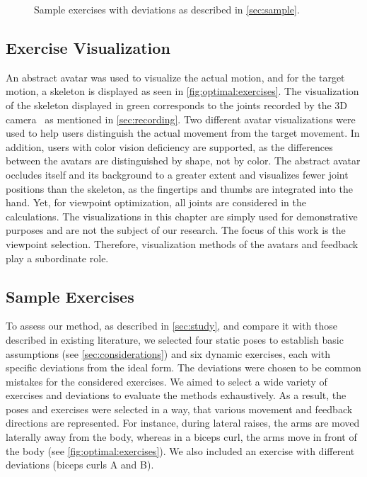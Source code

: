 \begin{figure}[t!]
	\caption{Sample exercises with deviations as described in \autoref{sec:sample}.}
	\label{fig:optimal:exercises}
\end{figure}

\subsection{Exercise Visualization \label{sec:exercise}}
An abstract avatar was used to visualize the actual motion, and for the target motion, a skeleton is displayed as seen in \autoref{fig:optimal:exercises}. The visualization of the skeleton displayed in green corresponds to the joints recorded by the 3D camera~\cite{kinect:documentation} as mentioned in \autoref{sec:recording}. Two different avatar visualizations were used to help users distinguish the actual movement from the target movement. In addition, users with color vision deficiency are supported, as the differences between the avatars are distinguished by shape, not by color. The abstract avatar occludes itself and its background to a greater extent and visualizes fewer joint positions than the skeleton, as the fingertips and thumbs are integrated into the hand. Yet, for viewpoint optimization, all joints are considered in the calculations. The visualizations in this chapter are simply used for demonstrative purposes and are not the subject of our research. The focus of this work is the viewpoint selection. Therefore, visualization methods of the avatars and feedback play a subordinate role.

\subsection{Sample Exercises \label{sec:sample}}
To assess our method, as described in \autoref{sec:study}, and compare it with those described in existing literature, we selected four static poses to establish basic assumptions (see \autoref{sec:considerations}) and six dynamic exercises, each with specific deviations from the ideal form. The deviations were chosen to be common mistakes for the considered exercises. We aimed to select a wide variety of exercises and deviations to evaluate the methods exhaustively. As a result, the poses and exercises were selected in a way, that various movement and feedback directions are represented. For instance, during lateral raises, the arms are moved laterally away from the body, whereas in a biceps curl, the arms move in front of the body (see \autoref{fig:optimal:exercises}). We also included an exercise with different deviations (biceps curls A and B).

